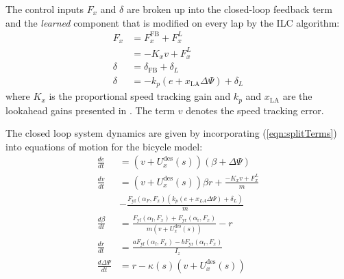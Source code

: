 \documentclass[9pt,shortpaper,twoside,web]{ieeecolor}
\begin{document}
The control inputs $F_x$ and $\delta$ are broken up into the closed-loop feedback term and the \textit{learned} component that is modified on every lap by the ILC algorithm:
\begin{align}
\label{eqn:splitTerms}
F_x &= F^{\mathrm{FB}}_x + F^L_x\\
    &= -K_xv + F^L_x\\
\delta &= \delta_{\mathrm{FB}} + \delta_L\\
\delta &= -k_p(e + x_\mathrm{LA}\Delta\Psi) + \delta_L
\end{align}
where $K_x$ is the proportional speed tracking gain and $k_p$ and $x_\mathrm{LA}$ are the lookahead gains presented in \cite{kapania}. The term $v$ denotes the speed tracking error.

The closed loop system dynamics are given by incorporating (\ref{eqn:splitTerms}) into equations of motion for the bicycle model: 
\begin{align}
\label{eq:fullNLCL}	
	\frac{de}{dt} &= \left(v+U^\mathrm{des}_x(s)\right)(\beta + \Delta\Psi) \\
	\frac{dv}{dt} &= \left(v+U^\mathrm{des}_x(s)\right)\beta r + \frac{-K_xv + F^L_x}{m} \\
	& - \frac{F_\mathrm{yf}(\alpha_F,F_x)(k_p(e + x_{LA}\Delta\Psi) + \delta_L)}{m}\\
	\frac{d\beta}{dt} &= \frac{F_\mathrm{yf}(\alpha_\mathrm{f}, F_x) + F_\mathrm{yr}(\alpha_\mathrm{r},F_x)}{m\left(v + U^\mathrm{des}_x(s)\right)} - r \\
	\frac{dr}{dt}     &= \frac{aF_\mathrm{yf}(\alpha_\mathrm{f}, F_x) - bF_\mathrm{yr}(\alpha_\mathrm{r}, F_x)}{I_z} \\
	\frac{d\Delta\Psi}{dt} &= r - \kappa(s)(v+U^\mathrm{des}_x(s))\label{eq:fullNLCL2}	
\end{align}
\end{document}
